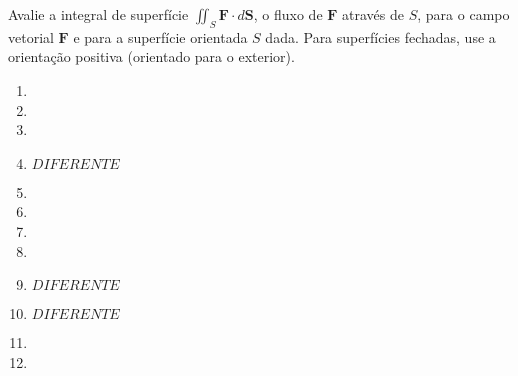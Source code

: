 	Avalie a integral de superfície $\displaystyle \iint_S \textbf{F} \cdot d\textbf{S}$, o fluxo de $\textbf{F}$ através de $S$, para o campo vetorial $\textbf{F}$ e para a superfície orientada $S$ dada. Para superfícies fechadas, use a orientação positiva (orientado para o exterior).
	
	\begin{enumerate}[resume]

		\item
		\resposta{}

		\item
		\resposta{}

		\item
		\resposta{}

		\item $DIFERENTE$

		\item
		\resposta{}

		\item
		\resposta{}

		\item
		\resposta{}

		\item
		\resposta{}

		\item $DIFERENTE$

		\item $DIFERENTE$

		\item
		\resposta{}

		\item
		\resposta{}
	
	\end{enumerate}
		
	\vspace{5mm}	
	
	


